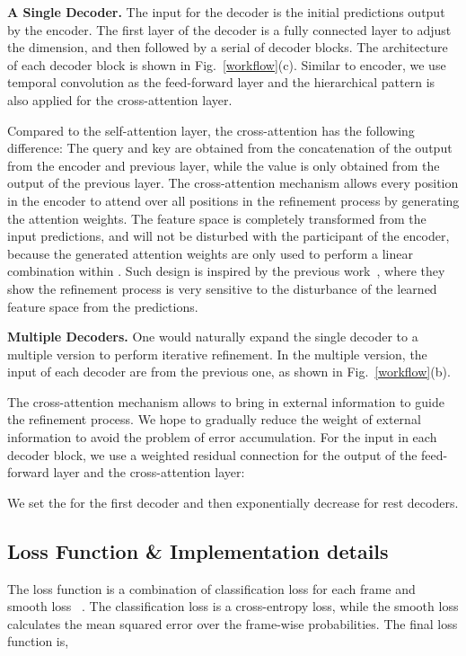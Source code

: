 \documentclass{bmvc2k}
\begin{document}
\noindent
\textbf{A Single Decoder.} 
The input for the decoder is the initial predictions output by the encoder. The first layer of the decoder is a fully connected layer to adjust the dimension, and then followed by a serial of decoder blocks. The architecture of each decoder block is shown in Fig.~\ref{workflow}(c). Similar to encoder, we use temporal convolution as the feed-forward layer and the hierarchical pattern is also applied for the cross-attention layer. 


Compared to the self-attention layer, the cross-attention has the following difference: The query  and key  are obtained from the concatenation of the output from the encoder and previous layer, while the value  is only obtained from the output of the previous layer. The cross-attention mechanism allows every position in the encoder to attend over all positions in the refinement process by generating the attention weights. The feature space  is completely transformed from the input predictions, and will not be disturbed with the participant of the encoder, because the generated attention weights are only used to perform a linear combination within . Such design is inspired by the previous work~\cite{MSTCN}, where they show the refinement process is very sensitive to the disturbance of the learned feature space from the predictions. 

\textbf{Multiple Decoders.} One would naturally expand the single decoder to a multiple version to perform iterative refinement. In the multiple version, the input of each decoder are from the previous one, as shown in Fig.~\ref{workflow}(b). 

The cross-attention mechanism allows to bring in external information to guide the refinement process. We hope to gradually reduce the weight of external information to avoid the problem of error accumulation. For the input  in each decoder block, we use a weighted residual connection for the output of the feed-forward layer and the cross-attention layer:
 



We set the  for the first decoder and then exponentially decrease  for rest decoders.


\subsection{Loss Function \& Implementation details}
\label{details}
The loss function is a combination of classification loss  for each frame and smooth loss ~\cite{MSTCN}. The classification loss is a cross-entropy loss, while the smooth loss calculates the mean squared error over the frame-wise probabilities. The final loss function  is,
 
\end{document}
